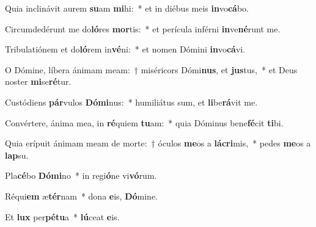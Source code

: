 \item Quia inclinávit aurem \textbf{su}am \textbf{mi}hi:~* et in diébus meis \textbf{in}vo\textbf{cá}bo.

\item Circumdedérunt me do\textbf{ló}res \textbf{mor}tis:~* et perícula inférni \textbf{in}ve\textbf{né}runt me.

\item Tribulatiónem et do\textbf{ló}rem in\textbf{vé}ni:~* et nomen Dómini \textbf{in}vo\textbf{cá}vi.

\item O Dómine, líbera ánimam meam:~† miséricors Dómi\textbf{nus}, et \textbf{jus}tus,~* et Deus noster \textbf{mi}se\textbf{ré}tur.

\item Custódiens \textbf{pár}vulos \textbf{Dó}\textbf{mi}nus:~* humiliátus sum, et \textbf{li}be\textbf{rá}vit me.

\item Convértere, ánima mea, in \textbf{ré}quiem \textbf{tu}am:~* quia Dóminus bene\textbf{fé}cit \textbf{ti}bi.

\item Quia erípuit ánimam meam de morte:~† óculos \textbf{me}os a \textbf{lá}\textbf{cri}mis,~* pedes \textbf{me}os a \textbf{lap}su.

\item Pla\textbf{cé}bo \textbf{Dó}\textbf{mi}no~* in regi\textbf{ó}ne vi\textbf{vó}rum.

\item Réqui\textbf{em} æ\textbf{tér}nam~* dona \textbf{e}is, \textbf{Dó}mine.

\item Et \textbf{lux} per\textbf{pé}\textbf{tu}a~* \textbf{lú}ceat \textbf{e}is.
